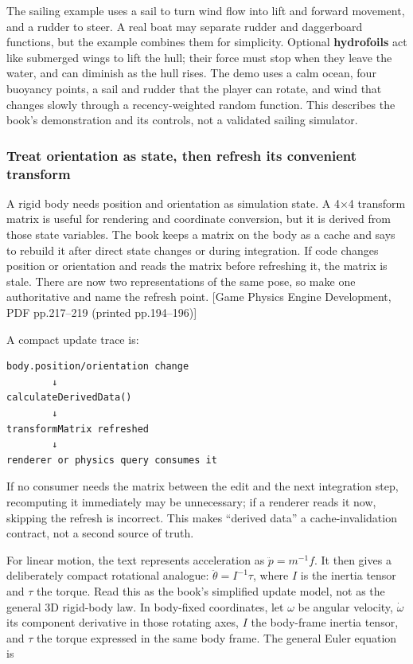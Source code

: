 The sailing example uses a sail to turn wind flow into lift and forward movement, and a rudder to steer. A real boat may separate rudder and daggerboard functions, but the example combines them for simplicity. Optional \textbf{hydrofoils} act like submerged wings to lift the hull; their force must stop when they leave the water, and can diminish as the hull rises. The demo uses a calm ocean, four buoyancy points, a sail and rudder that the player can rotate, and wind that changes slowly through a recency-weighted random function. This describes the book's demonstration and its controls, not a validated sailing simulator.

\subsubsection{Treat orientation as state, then refresh its convenient transform}\label{treat-orientation-as-state-then-refresh-its-convenient-transform}

A rigid body needs position and orientation as simulation state. A 4×4 transform matrix is useful for rendering and coordinate conversion, but it is derived from those state variables. The book keeps a matrix on the body as a cache and says to rebuild it after direct state changes or during integration. If code changes position or orientation and reads the matrix before refreshing it, the matrix is stale. There are now two representations of the same pose, so make one authoritative and name the refresh point. {[}Game Physics Engine Development, PDF pp.217--219 (printed pp.194--196){]}

A compact update trace is:

\begin{verbatim}
body.position/orientation change
        ↓
calculateDerivedData()
        ↓
transformMatrix refreshed
        ↓
renderer or physics query consumes it
\end{verbatim}

If no consumer needs the matrix between the edit and the next integration step, recomputing it immediately may be unnecessary; if a renderer reads it now, skipping the refresh is incorrect. This makes ``derived data'' a cache-invalidation contract, not a second source of truth.

For linear motion, the text represents acceleration as \(\ddot{p}=m^{-1}f\). It then gives a deliberately compact rotational analogue: \(\ddot{\theta}=I^{-1}\tau\), where \(I\) is the inertia tensor and \(\tau\) the torque. Read this as the book's simplified update model, not as the general 3D rigid-body law. In body-fixed coordinates, let \(\omega\) be angular velocity, \(\dot{\omega}\) its component derivative in those rotating axes, \(I\) the body-frame inertia tensor, and \(\tau\) the torque expressed in the same body frame. The general Euler equation is

